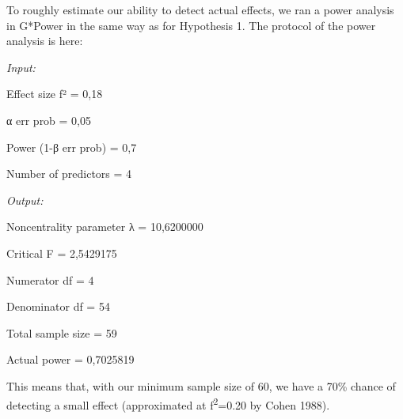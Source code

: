 \documentclass[
]{article}
\newenvironment{Shaded}{\begin{snugshade}}{\end{snugshade}}
\newcommand{\CommentTok}[1]{\textcolor[rgb]{0.56,0.35,0.01}{\textit{#1}}}
\newcommand{\DataTypeTok}[1]{\textcolor[rgb]{0.13,0.29,0.53}{#1}}
\newcommand{\KeywordTok}[1]{\textcolor[rgb]{0.13,0.29,0.53}{\textbf{#1}}}
\newcommand{\NormalTok}[1]{#1}
\newcommand{\OperatorTok}[1]{\textcolor[rgb]{0.81,0.36,0.00}{\textbf{#1}}}
\newcommand{\StringTok}[1]{\textcolor[rgb]{0.31,0.60,0.02}{#1}}
\begin{document}
To roughly estimate our ability to detect actual effects, we ran a power
analysis in G*Power in the same way as for Hypothesis 1. The protocol of
the power analysis is here:

\emph{Input:}

Effect size f² = 0,18

α err prob = 0,05

Power (1-β err prob) = 0,7

Number of predictors = 4

\emph{Output:}

Noncentrality parameter λ = 10,6200000

Critical F = 2,5429175

Numerator df = 4

Denominator df = 54

Total sample size = 59

Actual power = 0,7025819

This means that, with our minimum sample size of 60, we have a 70\%
chance of detecting a small effect (approximated at
f\textsuperscript{2}=0.20 by Cohen 1988).

\begin{Shaded}
\end{Shaded}
\end{document}
